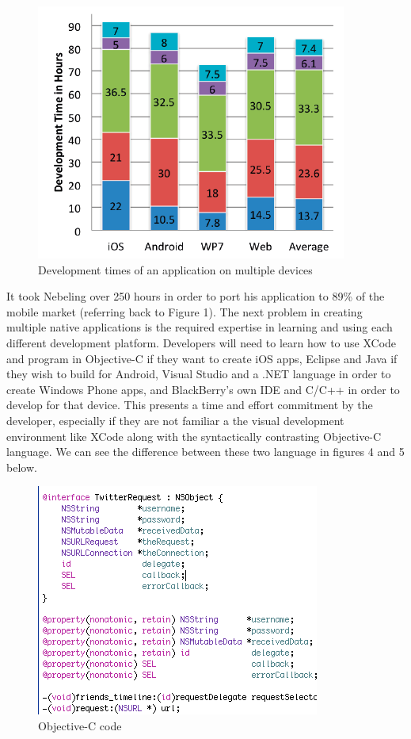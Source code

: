\documentclass[11pt, twocolumn]{article}
\begin{document}
\begin{figure}[h!]
\includegraphics[scale=0.7]{dev-times}
\caption{Development times of an application on multiple devices ~\cite{Nebeling2013}}
\end{figure}

It took Nebeling over 250 hours in order to port his application to 89\% of the mobile market (referring back to Figure 1).  The next problem in creating multiple native applications is the required expertise in learning and using each different development platform.  Developers will need to learn how to use XCode and program in Objective-C if they want to create iOS apps, Eclipse and Java if they wish to build for Android, Visual Studio and a .NET language in order to create Windows Phone apps, and BlackBerry's own IDE and C/C++ in order to develop for that device.  This presents a time and effort commitment by the developer, especially if they are not familiar a the visual development environment like XCode along with the syntactically contrasting Objective-C language. We can see the difference between these two language in figures 4 and 5 below.\\

\begin{figure}[h!]
\includegraphics[scale=0.63]{obj-c-code}
\caption{Objective-C code ~\cite{Treb}}
\end{figure}
\end{document}
